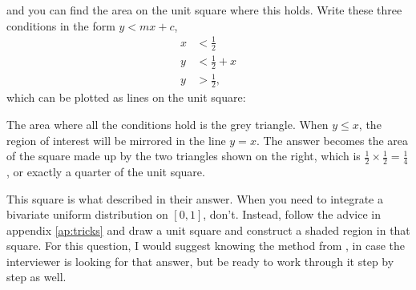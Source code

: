 \documentclass[a4paper]{article}
\begin{document}
and you can find the area on the unit square where this holds.
Write these three conditions in the form $y < mx + c$,
\begin{align}
x  &< \frac{1}{2}     \label{eq:stickbreaking:line1}  \\
y  &< \frac{1}{2} + x \label{eq:stickbreaking:line2}  \\
y  &> \frac{1}{2}     \label{eq:stickbreaking:line3}
\text{,}
\end{align}
which can be plotted as lines on the unit square:
\begin{center}
\end{center}
The area where all the conditions hold is the grey triangle.
When $y \leq x$, the region of interest will be mirrored in the line $y=x$.
The answer becomes the area of the square made up by the two triangles shown on the right, which is
$\frac{1}{2} \times \frac{1}{2} = \frac{1}{4}$, or exactly a quarter of the unit square.

This square is what \citet{JoshiQA} described in their answer.
When you need to integrate a bivariate uniform distribution on $[0,1]$, don't.
Instead, follow the advice in appendix \ref{ap:tricks} and draw a unit square and construct a shaded region in that square.
For this question, I would suggest knowing the method from \citet{JoshiQA}, in case the interviewer is looking for that answer, but be ready to work through it step by step as well.
\end{document}
